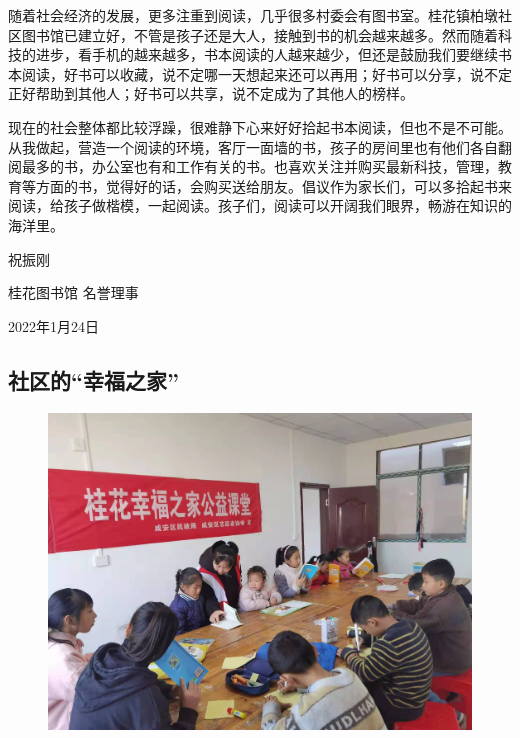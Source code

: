 随着社会经济的发展，更多注重到阅读，几乎很多村委会有图书室。桂花镇柏墩社区图书馆已建立好，不管是孩子还是大人，接触到书的机会越来越多。然而随着科技的进步，看手机的越来越多，书本阅读的人越来越少，但还是鼓励我们要继续书本阅读，好书可以收藏，说不定哪一天想起来还可以再用；好书可以分享，说不定正好帮助到其他人；好书可以共享，说不定成为了其他人的榜样。


现在的社会整体都比较浮躁，很难静下心来好好拾起书本阅读，但也不是不可能。从我做起，营造一个阅读的环境，客厅一面墙的书，孩子的房间里也有他们各自翻阅最多的书，办公室也有和工作有关的书。也喜欢关注并购买最新科技，管理，教育等方面的书，觉得好的话，会购买送给朋友。倡议作为家长们，可以多拾起书来阅读，给孩子做楷模，一起阅读。孩子们，阅读可以开阔我们眼界，畅游在知识的海洋里。










\vspace{10pt}


祝振刚

桂花图书馆 名誉理事

2022年1月24日
                



\vspace{10pt}

\hline



\vspace{10pt}

{\centering\subsection*{社区的“幸福之家”}}


\renewcommand{\leftmark}{社区的“幸福之家”}

\begin{figure}[htbp]

\centering

\includegraphics[width = .5\textwidth]{./ch/yjp1.jpg}

\end{figure}

